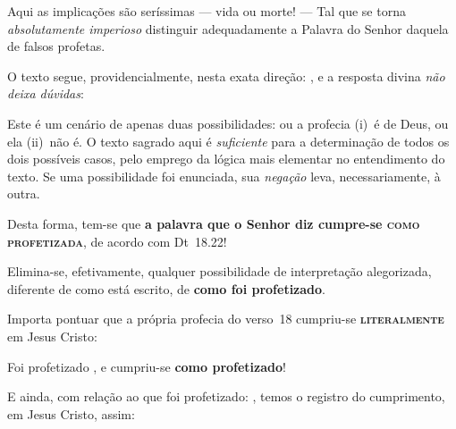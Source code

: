     Aqui as implicações são seríssimas --- vida ou morte!  ---  Tal  que  se  torna  \emph{absolutamente  imperioso}  distinguir
    adequadamente a Palavra do Senhor daquela de falsos profetas.

    O texto segue, providencialmente, nesta exata direção: , e a resposta divina \emph{não deixa dúvidas}:


    Este é um cenário de apenas duas possibilidades: ou a profecia (i)~é de Deus, ou ela (ii)~não é.  O  texto  sagrado  aqui  é
    \emph{suficiente} para a determinação de  todos  os  dois  possíveis  casos,  pelo  emprego  da  lógica  mais  elementar  no
    entendimento do texto. Se uma possibilidade foi enunciada, sua \emph{negação} leva, necessariamente, à outra.

    Desta forma, tem-se que \textbf{a palavra que o Senhor diz cumpre-se \textsc{como profetizada}}, de acordo com Dt~18.22!

    Elimina-se, efetivamente,  qualquer  possibilidade  de  interpretação  alegorizada,  diferente  de  como  está  escrito,  de
    \textbf{como foi profetizado}.

    Importa pontuar que a própria profecia do verso~18 cumpriu-se \textbf{\textsc{literalmente}} em Jesus Cristo:
 

    Foi profetizado , e cumpriu-se \textbf{como profetizado}!

    E ainda, com relação ao que foi profetizado: , temos o registro do
    cumprimento, em Jesus Cristo, assim:



